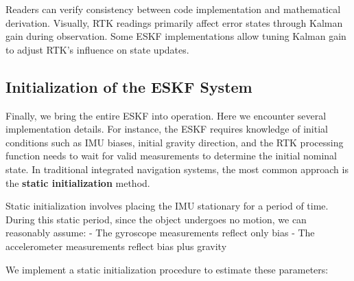 Readers can verify consistency between code implementation and mathematical derivation. Visually, RTK readings primarily affect error states through Kalman gain during observation. Some ESKF implementations allow tuning Kalman gain to adjust RTK's influence on state updates.

\subsection{Initialization of the ESKF System}
Finally, we bring the entire ESKF into operation. Here we encounter several implementation details. For instance, the ESKF requires knowledge of initial conditions such as IMU biases, initial gravity direction, and the RTK processing function needs to wait for valid measurements to determine the initial nominal state. In traditional integrated navigation systems, the most common approach is the \textbf{static initialization} method.

Static initialization involves placing the IMU stationary for a period of time. During this static period, since the object undergoes no motion, we can reasonably assume:
- The gyroscope measurements reflect only bias
- The accelerometer measurements reflect bias plus gravity

We implement a static initialization procedure to estimate these parameters:

